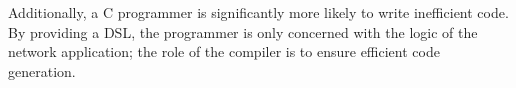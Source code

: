 Additionally, a C programmer is significantly more likely to write inefficient code. By providing a DSL, the programmer is only concerned with the logic of the network application; the role of the compiler is to ensure efficient code generation. 

%
%
%
%
%

